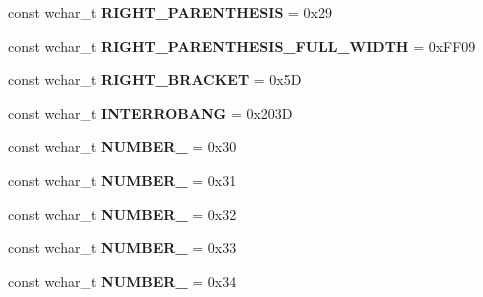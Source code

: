 \begin{DoxyCompactItemize}
\item 
\hypertarget{group___indexing_ga22dd9f8ece9f8b43141b5211692ac0b5}{const wchar\-\_\-t {\bfseries R\-I\-G\-H\-T\-\_\-\-P\-A\-R\-E\-N\-T\-H\-E\-S\-I\-S} = 0x29}\label{group___indexing_ga22dd9f8ece9f8b43141b5211692ac0b5}

\item 
\hypertarget{group___indexing_ga568d40ea261352120d1504e72aeab062}{const wchar\-\_\-t {\bfseries R\-I\-G\-H\-T\-\_\-\-P\-A\-R\-E\-N\-T\-H\-E\-S\-I\-S\-\_\-\-F\-U\-L\-L\-\_\-\-W\-I\-D\-T\-H} = 0x\-F\-F09}\label{group___indexing_ga568d40ea261352120d1504e72aeab062}

\item 
\hypertarget{group___indexing_ga15b5685be6c1a08a2798c8cabcfe666f}{const wchar\-\_\-t {\bfseries R\-I\-G\-H\-T\-\_\-\-B\-R\-A\-C\-K\-E\-T} = 0x5\-D}\label{group___indexing_ga15b5685be6c1a08a2798c8cabcfe666f}

\item 
\hypertarget{group___indexing_ga8811ed3c2e77e124080c4918e37896c9}{const wchar\-\_\-t {\bfseries I\-N\-T\-E\-R\-R\-O\-B\-A\-N\-G} = 0x203\-D}\label{group___indexing_ga8811ed3c2e77e124080c4918e37896c9}

\item 
\hypertarget{group___indexing_gafb4499a40da5432310a513f15bfbb3ec}{const wchar\-\_\-t {\bfseries N\-U\-M\-B\-E\-R\-\_} = 0x30}\label{group___indexing_gafb4499a40da5432310a513f15bfbb3ec}

\item 
\hypertarget{group___indexing_ga26cb9bd334885f19cba0afefc57109df}{const wchar\-\_\-t {\bfseries N\-U\-M\-B\-E\-R\-\_} = 0x31}\label{group___indexing_ga26cb9bd334885f19cba0afefc57109df}

\item 
\hypertarget{group___indexing_ga94919530331cebe6c34484421d044ac5}{const wchar\-\_\-t {\bfseries N\-U\-M\-B\-E\-R\-\_} = 0x32}\label{group___indexing_ga94919530331cebe6c34484421d044ac5}

\item 
\hypertarget{group___indexing_gabd88882b6c2513323b7cf8b48f223a77}{const wchar\-\_\-t {\bfseries N\-U\-M\-B\-E\-R\-\_} = 0x33}\label{group___indexing_gabd88882b6c2513323b7cf8b48f223a77}

\item 
\hypertarget{group___indexing_gaa8a633d55503e7f73e9dbbf9c376888b}{const wchar\-\_\-t {\bfseries N\-U\-M\-B\-E\-R\-\_} = 0x34}\label{group___indexing_gaa8a633d55503e7f73e9dbbf9c376888b}


\end{DoxyCompactItemize}
